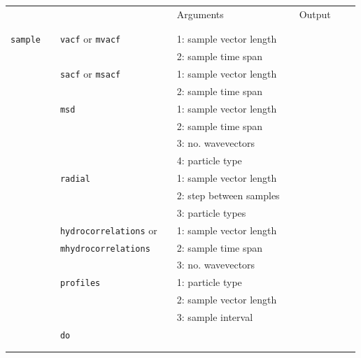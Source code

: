 \documentclass[11pt]{article}
\begin{document}
\begin{center}
  
  \begin{tabular}{cclclclll}
    {\color{red}{\textbf{Action}}} && {\color{blue}{Specifier}} && Arguments && Output \\
                                   && && && \\
    \hline
                                   && && && \\

    \verb!sample! && \verb!vacf! or \verb!mvacf! &&  1: sample vector length && \\
    $\mbox{}$   && &&  2: sample time span && \\
    $\mbox{}$   && \verb!sacf! or \verb!msacf! &&1: sample vector length && \\
    $\mbox{}$   &&                   &&  2: sample time span && \\
    $\mbox{}$   && \verb!msd! && 1: sample vector length && \\
    $\mbox{}$   &&            &&  2: sample time span && \\
    $\mbox{}$   &&            &&  3: no. wavevectors && \\
    $\mbox{}$   &&            &&  4: particle type && \\
    $\mbox{}$   && \verb!radial! &&  1: sample vector length && \\
    $\mbox{}$   &&            &&  2: step between samples  && \\
    $\mbox{}$   &&            &&  3: particle types && \\
    $\mbox{}$   && \verb!hydrocorrelations! or && 1: sample vector length && \\
    $\mbox{}$   && \verb!mhydrocorrelations!  &&  2: sample time span && \\
    $\mbox{}$   &&            &&  3: no. wavevectors && \\
    $\mbox{}$   && \verb!profiles! &&1: particle type && \\
    $\mbox{}$   &&                   &&  2: sample vector length && \\
    $\mbox{}$   &&                   &&  3: sample interval && \\
    $\mbox{}$   && \verb!do!         &&  && \\
                                   && && && \\
    
    \hline
                                   && && && \\
 
  \end{tabular}

\end{center}
\end{document}

